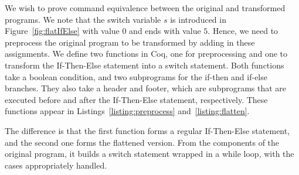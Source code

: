 \documentclass[compsoc,conference,a4paper,10pt,times]{IEEEtran}
\begin{document}
We wish to prove command equivalence between the original and transformed programs. We note that the switch variable $s$ is introduced in Figure~\ref{fig:flatIfElse} with value $0$ and ends with value $5$.  Hence, we need to preprocess the original program to be transformed by adding in these assignments.  We define two functions in Coq, one for preprocessing and one to transform the If-Then-Else statement into a switch statement.  
Both functions take a boolean condition, and two subprograms for the if-then and if-else branches.  They also take a header and footer, which are subprograms that are executed before and after the If-Then-Else statement, respectively.  These functions appear in Listings~\ref{listing:preprocess} and~\ref{listing:flatten}.
%
The difference is that the first function forms a regular If-Then-Else statement, and the second one forms the flattened version. From the components of the original program, it builds a switch statement wrapped in a while loop, with the cases appropriately handled.
\end{document}
